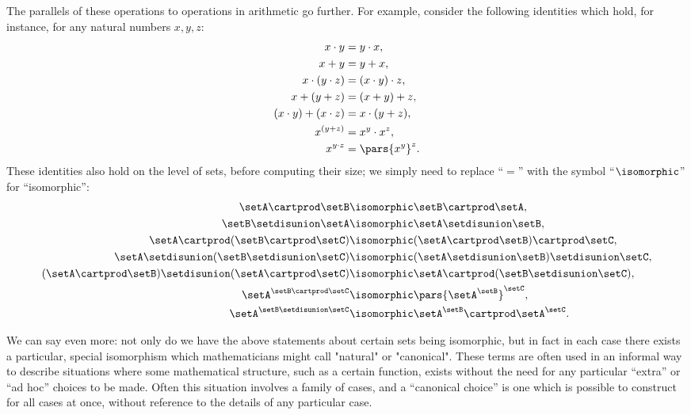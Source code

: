 The parallels of these operations to operations in arithmetic go further.
For example, consider the following identities which hold, for instance, for any natural numbers $x, y, z$: 
\begin{align}
    x \cdot y & = y \cdot x, \\
    x + y & = y + x, \\
    x \cdot (y \cdot z) & = (x \cdot y) \cdot z, \\
    x + (y + z) & = (x + y) + z, \\
    (x \cdot y) + (x \cdot z)  & = x \cdot (y + z), \\
    x^{(y + z)}           & = x^y \cdot x^z, \\
    x^{y \cdot z}                    & = \pars{x^y}^z.
\end{align}
These identities also hold on the level of sets, before computing their size; we simply need to replace ``$=$'' with the symbol ``$\isomorphic$'' for ``isomorphic'':
\begin{align}
    \setA \cartprod \setB & \isomorphic \setB \cartprod \setA, \\
    \setB \setdisunion \setA & \isomorphic \setA \setdisunion \setB, \\
    \setA \cartprod (\setB \cartprod \setC) & \isomorphic (\setA \cartprod \setB) \cartprod \setC, \\
    \setA \setdisunion (\setB \setdisunion \setC) & \isomorphic (\setA \setdisunion \setB) \setdisunion \setC, \\
    (\setA \cartprod \setB) \setdisunion (\setA \cartprod \setC)  & \isomorphic \setA \cartprod (\setB \setdisunion \setC), \\
    \setA^{\setB \cartprod \setC}                    & \isomorphic \pars{\setA^\setB}^\setC, \\
    \setA^{\setB \setdisunion \setC}           & \isomorphic \setA^\setB \cartprod \setA^\setC.
\end{align}

We can say even more: not only do we have the above statements about certain sets being isomorphic, but in fact in each case there exists a particular, special isomorphism which mathematicians might call "natural" or "canonical". These terms are often used in an informal way to describe situations where some mathematical structure, such as a certain function, exists without the need for any particular ``extra'' or ``ad hoc'' choices to be made. Often this situation involves a family of cases, and a ``canonical choice'' is one which is possible to construct for all cases at once, without reference to the details of any particular case.

